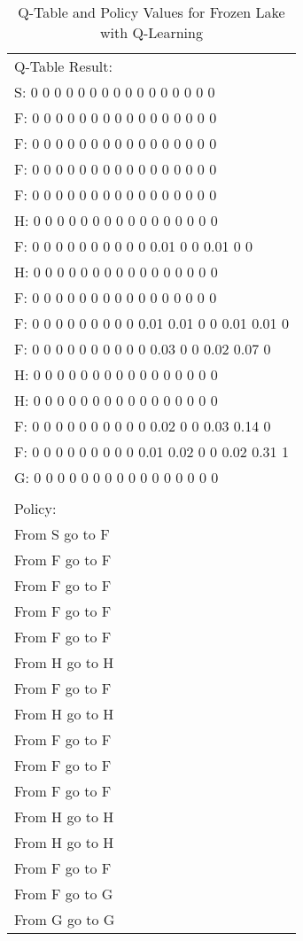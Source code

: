 \documentclass[11pt,letterpaper]{ryersonSGSThesis}
\begin{document}
\begin{ryersonSGSThesis}
    \begin{table}[h!]
    \centering
    \begin{tabular}{|l|} 
        \hline
            Q-Table Result: \\
            S:  0 0 0 0 0 0 0 0 0 0 0 0 0 0 0 0 \\
            F:  0 0 0 0 0 0 0 0 0 0 0 0 0 0 0 0 \\
            F:  0 0 0 0 0 0 0 0 0 0 0 0 0 0 0 0 \\
            F:  0 0 0 0 0 0 0 0 0 0 0 0 0 0 0 0 \\
            F:  0 0 0 0 0 0 0 0 0 0 0 0 0 0 0 0 \\
            H:  0 0 0 0 0 0 0 0 0 0 0 0 0 0 0 0 \\
            F:  0 0 0 0 0 0 0 0 0 0 0.01 0 0 0.01 0 0 \\ 
            H:  0 0 0 0 0 0 0 0 0 0 0 0 0 0 0 0 \\
            F:  0 0 0 0 0 0 0 0 0 0 0 0 0 0 0 0 \\
            F:  0 0 0 0 0 0 0 0 0 0.01 0.01 0 0 0.01 0.01 0 \\
            F:  0 0 0 0 0 0 0 0 0 0 0.03 0 0 0.02 0.07 0 \\
            H:  0 0 0 0 0 0 0 0 0 0 0 0 0 0 0 0 \\
            H:  0 0 0 0 0 0 0 0 0 0 0 0 0 0 0 0 \\
            F:  0 0 0 0 0 0 0 0 0 0 0.02 0 0 0.03 0.14 0 \\
            F:  0 0 0 0 0 0 0 0 0 0.01 0.02 0 0 0.02 0.31 1 \\
            G:  0 0 0 0 0 0 0 0 0 0 0 0 0 0 0 0 \\
            \\
            Policy: \\
            From S go to F \\
            From F go to F \\
            From F go to F \\
            From F go to F \\
            From F go to F \\
            From H go to H \\
            From F go to F \\
            From H go to H \\
            From F go to F \\
            From F go to F \\
            From F go to F \\
            From H go to H \\
            From H go to H \\
            From F go to F \\
            From F go to G \\
            From G go to G \\ [1ex]
        \hline
    \end{tabular}
    \caption{Q-Table and Policy Values for Frozen Lake with Q-Learning} \label{table:FrozenLakeResult}
    \end{table}
    

\end{ryersonSGSThesis}
\end{document}
